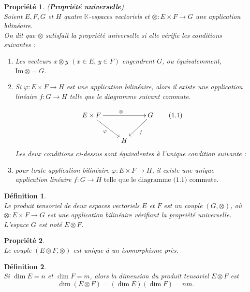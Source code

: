 \documentclass[a4paper, 14pt]{report}
\newtheorem{definition}{Définition}[section]
\newtheorem{propriety}{Propriété}[section]
\begin{document}
\begin{onehalfspace}
{			\begin{propriety}(\textbf{Propriété universelle}) \cite{greub2012linear}\\
Soient \( E,F ,G \) et \(H\) quatre \(\mathbb{K}\)-espaces vectoriels et \(\otimes : E \times F \to G \) une application bilinéaire. \\
On dit que $\otimes$ satisfait la \textit{propriété universelle} si elle vérifie les conditions suivantes :
				\begin{enumerate} [label=\roman*)]
					\item Les vecteurs $x \otimes y$ $(x \in E, \, y \in F)$ engendrent $G$, ou équivalemment, $\mathrm{Im} \, \otimes = G$.
					\item Si \(\varphi : E \times F \to H \) est une application bilinéaire, alors il existe une application linéaire $f : G \to H$ telle que le diagramme suivant commute.
					
					\[
					\xymatrix{
						E \times F \ar[rr]^{\otimes} \ar[dr]_{\varphi} & & G \ar[dl]^{f} \\
						& H &
					}  \quad \quad \text{(1.1)}
					\] 
					Les deux conditions ci-dessus sont équivalentes à l'unique condition suivante :
					\item pour toute application bilinéaire  $\varphi : E \times F \to H$,  il existe une unique application linéaire \(f : G \to H \text{ telle que le diagramme (1.1) commute.}\)
				\end{enumerate}
			\end{propriety}
			
			
			\begin{definition} \cite{greub2012linear}\\
Le produit tensoriel de deux espaces vectoriels $E$ et $F$ est un couple $(G, \otimes)$, où $\otimes : E \times F \to G$ est une application bilinéaire vérifiant la propriété universelle.\\
				L'espace $G$ est noté $E \otimes F$.
			\end{definition}
			
			\begin{propriety} \cite{greub2012linear}\\
				Le couple \( (E \otimes F, \otimes) \) est unique à un isomorphisme près.
			\end{propriety}
			
			\begin{definition} \cite{axler2024linear}\\
				Si \( \dim E = n \) et \( \dim F = m \), alors la dimension du produit tensoriel \( E \otimes F \) est
				\[
				\dim(E \otimes F) = (\dim E) (\dim F) = nm.
				\]
			\end{definition}

}
\end{onehalfspace}
\end{document}
